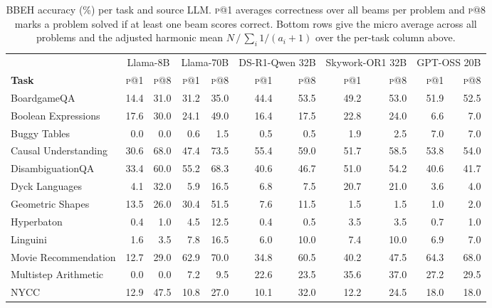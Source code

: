 \begin{table}[!htbp]
  \caption{BBEH accuracy (\%) per task and source LLM. \textsc{p@1} averages correctness over all beams per problem and \textsc{p@8} marks a problem solved if at least one beam scores correct. Bottom rows give the micro average across all problems and the adjusted harmonic mean $N\,/\,\sum_i 1/(a_i+1)$ over the per-task column above.}
  \label{tab:bbeh-accuracy}
  \centering
  \footnotesize
  \begin{tabular}{@{}l rr rr rr rr rr@{}}
    \toprule
     & \multicolumn{2}{c}{Llama-8B} & \multicolumn{2}{c}{Llama-70B} & \multicolumn{2}{c}{DS-R1-Qwen 32B} & \multicolumn{2}{c}{Skywork-OR1 32B} & \multicolumn{2}{c}{GPT-OSS 20B} \\
    \cmidrule(lr){2-3} \cmidrule(lr){4-5} \cmidrule(lr){6-7} \cmidrule(lr){8-9} \cmidrule(lr){10-11}
    \textbf{Task} & \textsc{p@1} & \textsc{p@8} & \textsc{p@1} & \textsc{p@8} & \textsc{p@1} & \textsc{p@8} & \textsc{p@1} & \textsc{p@8} & \textsc{p@1} & \textsc{p@8} \\
    \midrule
    BoardgameQA & 14.4 & 31.0 & 31.2 & 35.0 & 44.4 & 53.5 & 49.2 & 53.0 & 51.9 & 52.5 \\
    Boolean Expressions & 17.6 & 30.0 & 24.1 & 49.0 & 16.4 & 17.5 & 22.8 & 24.0 & 6.6 & 7.0 \\
    Buggy Tables & 0.0 & 0.0 & 0.6 & 1.5 & 0.5 & 0.5 & 1.9 & 2.5 & 7.0 & 7.0 \\
    Causal Understanding & 30.6 & 68.0 & 47.4 & 73.5 & 55.4 & 59.0 & 51.7 & 58.5 & 53.8 & 54.0 \\
    DisambiguationQA & 33.4 & 60.0 & 55.2 & 68.3 & 40.6 & 46.7 & 51.0 & 54.2 & 40.6 & 41.7 \\
    Dyck Languages & 4.1 & 32.0 & 5.9 & 16.5 & 6.8 & 7.5 & 20.7 & 21.0 & 3.6 & 4.0 \\
    Geometric Shapes & 13.5 & 26.0 & 30.4 & 51.5 & 7.6 & 11.5 & 1.5 & 1.5 & 1.0 & 2.0 \\
    Hyperbaton & 0.4 & 1.0 & 4.5 & 12.5 & 0.4 & 0.5 & 3.5 & 3.5 & 0.7 & 1.0 \\
    Linguini & 1.6 & 3.5 & 7.8 & 16.5 & 6.0 & 10.0 & 7.4 & 10.0 & 6.9 & 7.0 \\
    Movie Recommendation & 12.7 & 29.0 & 62.9 & 70.0 & 34.8 & 60.5 & 40.2 & 47.5 & 64.3 & 68.0 \\
    Multistep Arithmetic & 0.0 & 0.0 & 7.2 & 9.5 & 22.6 & 23.5 & 35.6 & 37.0 & 27.2 & 29.5 \\
    NYCC & 12.9 & 47.5 & 10.8 & 27.0 & 10.1 & 32.0 & 12.2 & 24.5 & 18.0 & 18.0 \\

\end{tabular}
\end{table}
